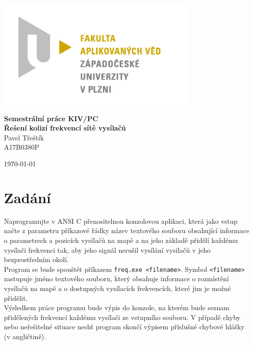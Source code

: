 \documentclass[12pt]{article}
\begin{document}
\begin{titlepage}
\centerline{\includegraphics[width=10cm]{img/logo.jpg}}
\begin{center}
\vspace{30px}
{\Huge
\textbf{Semestrální práce KIV/PC}\\
\vspace{1cm}
}
{\Large
\textbf{Řešení kolizí frekvencí sítě vysílačů}\\
}
\vspace{1cm}
{\large
Pavel Třeštík\\
}
{\normalsize
A17B0380P
}
\end{center}
\vspace{\fill}
\hfill
\begin{minipage}[t]{7cm}
\flushright
\today
\end{minipage}
\end{titlepage}

\tableofcontents
\newpage
{} %
%
%
\section{Zadání}
Naprogramujte v ANSI C přenositelnou konzolovou aplikaci, která jako vstup
načte z parametru příkazové řádky název textového souboru obsahující
informace o parametrech a pozicích vysílačů na mapě a na jeho základě
přidělí každému vysílači frekvenci tak, aby jeho signál nerušil
vysílání vysílačů v jeho bezprostředním okolí.\\

Program se bude spouštět příkazem \texttt{freq.exe <filename>}. Symbol
\texttt{<filename>} zastupuje jméno textového souboru, který obsahuje
informace o rozmístění vysílačů na mapě a o dostupných vysílacích
frekvencích, které jim je možné přidělit.\\

Výsledkem práce programu bude výpis do konzole, na kterém bude seznam
přidělených frekvencí každému vysílači ze vstupního souboru. V případě
chyby nebo neřešitelné situace nechť program skončí výpisem příslušné
chybové hlášky (v angličtině).\\
\end{document}

